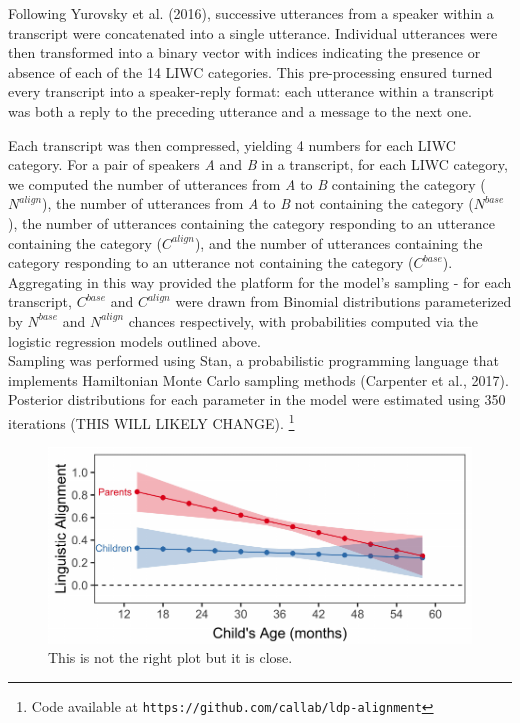 \documentclass[10pt, letterpaper]{article}
\newenvironment{CodeChunk}{}{}
\begin{document}
Following Yurovsky et al. (2016), successive utterances from a speaker
within a transcript were concatenated into a single utterance.
Individual utterances were then transformed into a binary vector with
indices indicating the presence or absence of each of the 14 LIWC
categories. This pre-processing ensured turned every transcript into a
speaker-reply format: each utterance within a transcript was both a
reply to the preceding utterance and a message to the next one.

Each transcript was then compressed, yielding 4 numbers for each LIWC
category. For a pair of speakers \emph{A} and \emph{B} in a transcript,
for each LIWC category, we computed the number of utterances from
\emph{A} to \emph{B} containing the category (\(N^{align}\)), the number
of utterances from \emph{A} to \emph{B} not containing the category
(\(N^{base}\)), the number of utterances containing the category
responding to an utterance containing the category (\(C^{align}\)), and
the number of utterances containing the category responding to an
utterance not containing the category (\(C^{base}\)). Aggregating in
this way provided the platform for the model's sampling - for each
transcript, \(C^{base}\) and \(C^{align}\) were drawn from Binomial
distributions parameterized by \(N^{base}\) and \(N^{align}\) chances
respectively, with probabilities computed via the logistic regression
models outlined above.\\
Sampling was performed using Stan, a probabilistic programming language
that implements Hamiltonian Monte Carlo sampling methods (Carpenter et
al., 2017). Posterior distributions for each parameter in the model were
estimated using 350 iterations (THIS WILL LIKELY CHANGE).
\footnote{Code available at \texttt{https://github.com/callab/ldp-alignment}}

\begin{CodeChunk}
\begin{figure}[h]

{\centering \includegraphics{figs/2-col-image-1} 

}

\caption[This is not the right plot but it is close]{This is not the right plot but it is close.}\label{fig:2-col-image}
\end{figure}
\end{CodeChunk}
\end{document}
